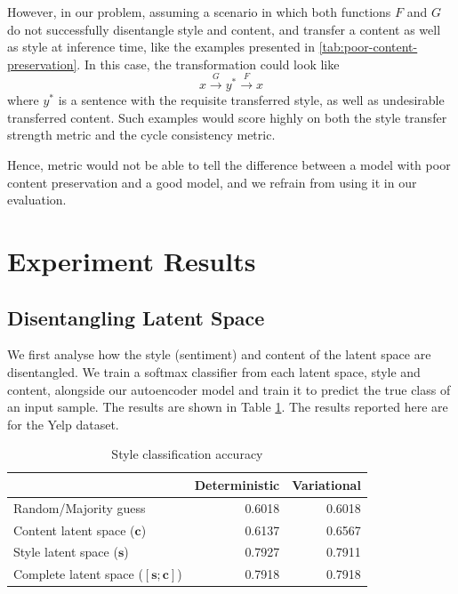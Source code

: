 However, in our problem, assuming a scenario in which both functions $F$ and $G$ do not successfully disentangle style and content, and transfer a content as well as style at inference time, like the examples presented in \ref{tab:poor-content-preservation}. In this case, the transformation could look like
\begin{equation*}
	x \xrightarrow{G} y^* \xrightarrow{F} x
\end{equation*}
where $y^*$ is a sentence with the requisite transferred style, as well as undesirable transferred content. Such examples would score highly on both the style transfer strength metric and the cycle consistency metric.

Hence, metric would not be able to tell the difference between a model with poor content preservation and a good model, and we refrain from using it in our evaluation.


\section{Experiment Results}


\subsection{Disentangling Latent Space}

We first analyse how the style (sentiment) and content of the latent space are disentangled. We train a softmax classifier from each latent space, style and content, alongside our autoencoder model and train it to predict the true class of an input sample. The results are shown in Table \ref{tab:latent-space-classification}. The results reported here are for the Yelp dataset.

\begin{table}[ht]
	\centering
	\begin{tabular}{| l | r | r |}
		\hline
		                                        & \textbf{Deterministic} & \textbf{Variational} \\
		\hline \hline
		Random/Majority guess                   & 0.6018                 & 0.6018               \\ \hline \hline
		Content latent space  ($\bm c$)         & 0.6137                 & 0.6567               \\ \hline
		Style latent space ($\bm s$)            & 0.7927                 & 0.7911               \\ \hline
		Complete latent space ($[\bm s;\bm c]$) & 0.7918                 & 0.7918               \\
		\hline
	\end{tabular}
	\caption{Style classification accuracy}
	\label{tab:latent-space-classification}
\end{table}

